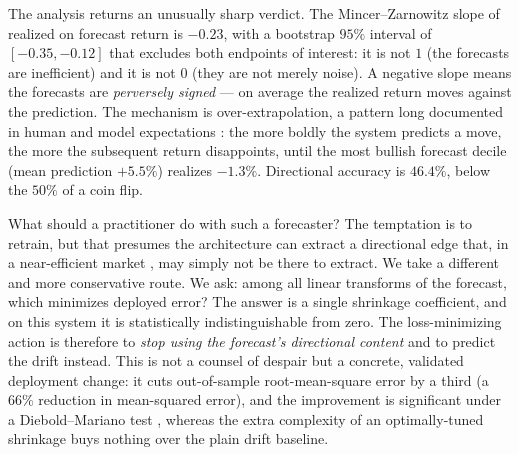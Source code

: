 \documentclass[10pt,twocolumn,twoside]{eec_style}
\begin{document}
The analysis returns an unusually sharp verdict. The Mincer--Zarnowitz slope of realized
on forecast return is $-0.23$, with a bootstrap $95\%$ interval of $[-0.35,-0.12]$
that excludes both endpoints of interest: it is not $1$ (the forecasts are
inefficient) and it is not $0$ (they are not merely noise). A negative slope means the
forecasts are \emph{perversely signed} --- on average the realized return moves against
the prediction. The mechanism is over-extrapolation, a pattern long documented in human
and model expectations \cite{bordalo2019}: the more boldly the system
predicts a move, the more the subsequent return disappoints, until the most bullish
forecast decile (mean prediction $+5.5\%$) realizes $-1.3\%$. Directional accuracy is
$46.4\%$, below the $50\%$ of a coin flip.

What should a practitioner do with such a forecaster? The temptation is to retrain, but
that presumes the architecture can extract a directional edge that, in a near-efficient
market \cite{fama1970,welch2008}, may simply not be there to extract. We take a
different and more conservative route. We ask: among all linear transforms of the
forecast, which minimizes deployed error? The answer is a single shrinkage coefficient,
and on this system it is statistically indistinguishable from zero. The
loss-minimizing action is therefore to \emph{stop using the forecast's directional
content} and to predict the drift instead. This is not a counsel of despair but a
concrete, validated deployment change: it cuts out-of-sample root-mean-square error by
a third (a $66\%$ reduction in mean-squared error), and the improvement is significant
under a Diebold--Mariano test \cite{diebold1995}, whereas the extra complexity of an
optimally-tuned shrinkage buys nothing over the plain drift baseline.
\end{document}
